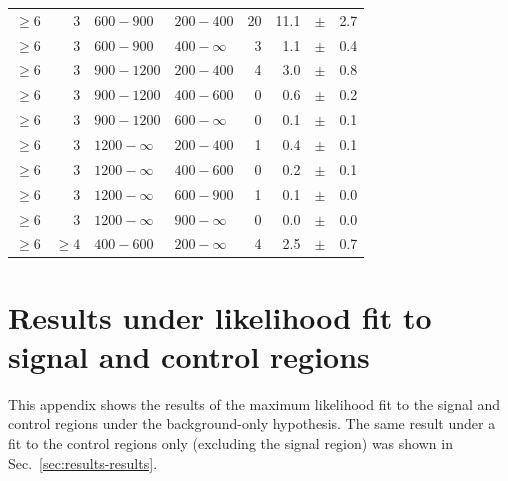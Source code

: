 \begin{table}[!h]
\begin{tabular}{rrllrrcl}
		$\geq 6$\T & 3 & $ 600- 900$ & $200-400$ &     20 &     11.1 &$\pm$&    
		2.7 \\
		$\geq 6$ & 3 & $ 600- 900$ & $400-\infty$ &      3 &      1.1 
		&$\pm$&    0.4 \\
		$\geq 6$\T & 3 & $ 900-1200$ & $200-400$ &      4 &      3.0 &$\pm$&    
		0.8 \\
		$\geq 6$ & 3 & $ 900-1200$ & $400-600$ &      0 &      0.6 &$\pm$&    
		0.2 \\
		$\geq 6$ & 3 & $ 900-1200$ & $600-\infty$ &      0 &      0.1 
		&$\pm$&    0.1 \\
		$\geq 6$\T & 3 & $1200- \infty$ & $200-400$ &      1 &      0.4 
		&$\pm$&    0.1 \\
		$\geq 6$ & 3 & $1200- \infty$ & $400-600$ &      0 &      0.2 
		&$\pm$&    0.1 \\
		$\geq 6$ & 3 & $1200- \infty$ & $600-900$ &      1 &      0.1 
		&$\pm$&    0.0 \\
		$\geq 6$ & 3 & $1200- \infty$ & $900-\infty$ &      0 &      0.0 
		&$\pm$&    0.0 \\
		$\geq 6$\T & $\geq 4$ & $ 400- 600$ & $200-\infty$ &      4 &      2.5 
		&$\pm$&    0.7 \\
		\hline
	\end{tabular}
\end{table}

\clearpage
\section{Results under likelihood fit to signal and control regions}
\label{app:results-fullfit}
This appendix shows the results of the maximum likelihood fit to the signal and 
control regions under the background-only hypothesis. The same result under a 
fit to the control regions only (excluding the signal region) was shown in 
Sec.~\ref{sec:results-results}.

